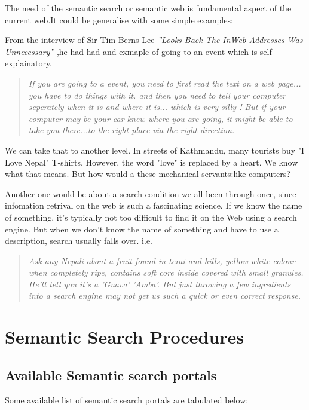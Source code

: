 \documentclass[12pt,a4]{article}
\begin{document}
The need of the semantic search or semantic web is fundamental aspect of the current web.It could be generalise with some simple examples:
\begin{description}
\clearpage
\item[Example1:] From the interview of Sir Tim Berns Lee \textit{''Looks Back The InWeb Addresses Was Unnecessary\cite{tim}''} ,he had had and exmaple of going to an event which is  self explainatory.
  \begin{quote}	\textit{If you are going to a event, you need to first read the text on a web page... you have to do things with it. and then you need to tell your computer seperately when it is and where it is... which is very silly ! But if your computer may be your car knew where you are going, it might be able to take you there...to the right place via the right direction.}
  \end{quote}

\item[Example2:] We can take that to another level. In streets of Kathmandu, many tourists buy "I Love Nepal" T-shirts. However, the word "love" is replaced by a heart. We know what that means. But how would a these mechanical servants:like computers?

\item[Example3:] Another one would be about a search condition we all been through once, since infomation retrival on the web is such a fascinating science. If we know the name of something, it's typically not too difficult to find it on the Web using a search engine. But when we don't know the name of something and have to use a description, search usually falls over. i.e.
  \begin{quote}\textit{Ask any Nepali about a fruit found in terai and hills, yellow-white colour when completely ripe, contains soft core inside covered with small granules. He'll tell you it's a 'Guava' \textit{'Amba'}. But just throwing a few ingredients into a search engine may not get us such a quick or even correct response.}
  \end{quote}
  
\end{description}
\clearpage
\section{Semantic Search Procedures}
\subsection{Available Semantic search portals}
Some available list of semantic search portals are tabulated below:
\end{document}
